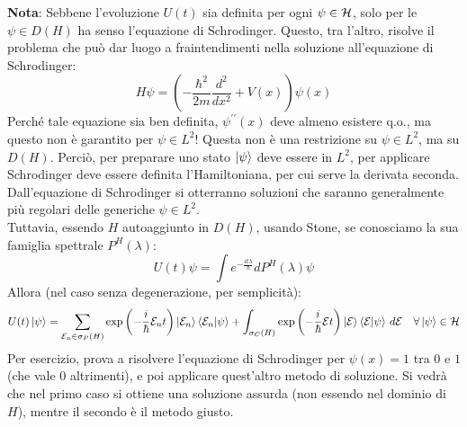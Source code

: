 \documentclass[../../FisicaTeorica.tex]{subfiles}
\begin{document}
\textbf{Nota}: Sebbene l'evoluzione $U(t)$ sia definita per ogni $\psi \in \mathcal{H}$, solo per le $\psi \in D(H)$ ha senso l'equazione di Schrodinger. Questo, tra l'altro, risolve il problema che può dar luogo a fraintendimenti nella soluzione all'equazione di Schrodinger:
\[
	H\psi =\left(-\frac{\hbar^2}{2m}\frac{d^2}{dx^2}+V\left(x\right)\right)\psi \left(x\right)
\]
	Perché tale equazione sia ben definita, $\psi^{\prime\prime}(x)$ deve almeno esistere q.o., ma questo non è garantito per $\psi \in L^2$! Questa non è una restrizione su $\psi \in L^2$, ma su $D(H)$. Perciò, per preparare uno stato $\ket{\psi}$ deve essere in $L^2$, per applicare Schrodinger deve essere definita l'Hamiltoniana, per cui serve la derivata seconda. Dall'equazione di Schrodinger si otterranno soluzioni che saranno generalmente più regolari delle generiche $\psi \in L^2$.\\
	Tuttavia, essendo $H$ autoaggiunto in $D\left(H\right)$, usando Stone, se conosciamo la sua famiglia spettrale $P^H\left(\lambda\right)$:
	\[
	U\left(t\right)\psi =\int e^{-\frac{it\lambda}{\hbar}}dP^H\left(\lambda\right)\psi 
	\]
	Allora (nel caso senza degenerazione, per semplicità):
	\[ %
	U(t)\ket{\psi} = \sum_{\mathcal{E}_n \in \sigma_P(H)} \exp\left (-\frac{i}{\hbar}\mathcal{E}_n t\right) \ket{\mathcal{E}_n}\braket{\mathcal{E}_n |\psi} +
	\int_{\sigma_C(H)} \exp\left(-\frac{i}{\hbar}\mathcal{E}t\right ) \ket{\mathcal{E}}\braket{\mathcal{E}|\psi}\, d\mathcal{E} \quad \forall \ket{\psi}\in \hs
	\]
Per esercizio, prova a risolvere l'equazione di Schrodinger per $\psi \left(x\right)=1$ tra $0$ e $1$ (che vale $0$ altrimenti), e poi applicare quest'altro metodo di soluzione. Si vedrà che nel primo caso si ottiene una soluzione assurda (non essendo nel dominio di $H$), mentre il secondo è il metodo giusto.
\end{document}
